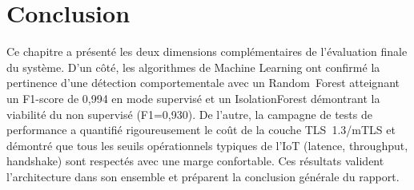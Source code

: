 \section{Conclusion}

Ce chapitre a présenté les deux dimensions complémentaires de l'évaluation finale du système. D'un côté, les algorithmes de Machine Learning ont confirmé la pertinence d'une détection comportementale avec un Random~Forest atteignant un F1-score de 0,994 en mode supervisé et un IsolationForest démontrant la viabilité du non supervisé (F1=0,930). De l'autre, la campagne de tests de performance a quantifié rigoureusement le coût de la couche TLS~1.3/mTLS et démontré que tous les seuils opérationnels typiques de l'IoT (latence, throughput, handshake) sont respectés avec une marge confortable. Ces résultats valident l'architecture dans son ensemble et préparent la conclusion générale du rapport.
